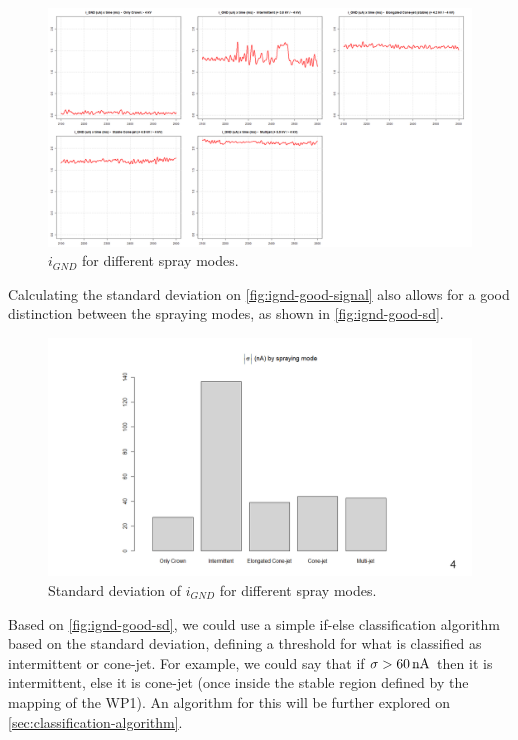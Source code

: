 \documentclass[oneside,12pt]{article}
\begin{document}
\begin{figure}[h!]
    \centering
    \includegraphics[width=1\textwidth,trim=1 1 1 1,clip]{figures/ignd-good-signal.png}
    \caption{$i_{GND}$ for different spray modes.}
    \label{fig:ignd-good-signal}
\end{figure}

Calculating the standard deviation on \autoref{fig:ignd-good-signal} also allows for a good distinction between the spraying modes,
as shown in \autoref{fig:ignd-good-sd}.

\begin{figure}[h!]
    \centering
    \includegraphics[width=1\textwidth,trim=1 1 1 1,clip]{figures/ignd-good-sd.png}
    \caption{Standard deviation of $i_{GND}$ for different spray modes.}
    \label{fig:ignd-good-sd}
\end{figure}

Based on \autoref{fig:ignd-good-sd}, we could use a simple if-else classification algorithm based on the standard deviation, 
defining a threshold for what is classified as intermittent or cone-jet. For example, we could say that if $\sigma > 60 \,\mathrm{nA}$
then it is intermittent, else it is cone-jet (once inside the stable region defined by the mapping of the WP1).
An algorithm for this will be further explored on \autoref{sec:classification-algorithm}.
\end{document}
